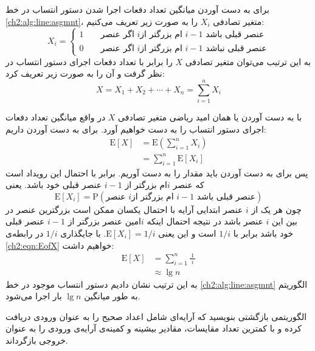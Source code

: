 
برای به دست آوردن میانگین تعداد دفعات اجرا شدن دستور انتساب در خط {\ref{ch2:alg:line:asgmnt}}، متغیر تصادفی {$X_i$} را به صورت زیر تعریف می‌کنیم:
\begin{displaymath}
X_i=
\begin{cases}
1\qquad\text{اگر عنصر {$i$}ام بزرگتر از {$i-1$} عنصر قبلی باشد}\\
0\qquad\text{اگر عنصر {$i$}ام بزرگتر از {$i-1$} عنصر قبلی نباشد}
\end{cases}
\end{displaymath}
به این ترتیب می‌توان متغیر تصادفی {$X$} را برابر با تعداد دفعات اجرای دستور انتساب در نظر گرفت و آن را به صورت زیر تعریف کرد:
\begin{displaymath}
X=X_1+X_2+\cdots + X_n=\sum_{i=1}^{n}{X_i}
\end{displaymath}

با به دست آوردن {} یا همان امید ریاضی متغیر تصادفی {$X$} در واقع میانگین تعداد دفعات اجرای دستور انتساب را به دست خواهیم آورد. برای به دست آوردن {} داریم:
\begin{align}
\mathrm{E}[X]&=\mathrm{E}\left(\sum_{i=1}^{n}{X_i}\right)\nonumber\\
	&=\sum_{i=1}^{n}{\mathrm{E}[X_i]}\label{ch2:eqn:EofX}
\end{align}
پس برای به دست آوردن {} باید مقدار {} را به دست آوریم. {} برابر با احتمال این رویداد است که عنصر {$i$}ام بزرگتر از {$i-1$} عنصر قبلی خود باشد. یعنی 
\begin{displaymath}
\mathrm{E}[X_i]=\mathrm{P}(\text{عنصر {$i$}ام بزرگتر از {$i-1$} عنصر قبلی باشد})
\end{displaymath}
چون هر یک از {$i$} عنصر ابتدایی آرایه با احتمال یکسان ممکن است بزرگترین عنصر در بین این {$i$} عنصر باشد در نتیجه احتمال اینکه {$i$}امین عنصر بزرگتر از {$i-1$} عنصر قبلی خود باشد برابر با {$1/i$} است و این یعنی {$\mathrm{E}[X_i]=1/i$}. با جایگذاری {$1/i$} در رابطه‌ی {\eqref{ch2:eqn:EofX}} خواهیم داشت:
\begin{align*}
\mathrm{E}[X]&=\sum_{i=1}^{n}{\frac{\ 1\ }{i}}\\
	&\approx\lg n
\end{align*}
به این ترتیب نشان دادیم دستور انتساب موجود در خط {\ref{ch2:alg:line:asgmnt}} الگوریتم {} به طور میانگین {$\lg n$} بار اجرا می‌شود.

 الگوریتمی بازگشتی بنویسید که آرایه‌ای شامل اعداد صحیح را به عنوان ورودی دریافت کرده و با کمترین تعداد مقایسات، مقادیر بیشینه و کمینه‌ی آرایه‌‌ی ورودی را به عنوان خروجی بازگرداند.

